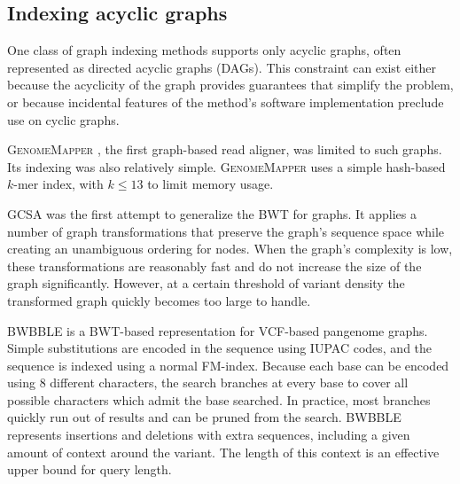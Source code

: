 \subsection{Indexing acyclic graphs}

One class of graph indexing methods supports only acyclic graphs, often represented as directed acyclic graphs (DAGs).
This constraint can exist either because the acyclicity of the graph provides guarantees that simplify the problem, or because incidental features of the method's software implementation preclude use on cyclic graphs.
 
\textsc{GenomeMapper} \cite{Schneeberger_2009}, the first graph-based read aligner, was limited to such graphs.
Its indexing was also relatively simple.
\textsc{GenomeMapper} uses a simple hash-based $k$-mer index, with $k \le 13$ to limit memory usage.

\textsc{GCSA} \cite{Siren_2014} was the first attempt to generalize the BWT for graphs.
It applies a number of graph transformations that preserve the graph's sequence space while creating an unambiguous ordering for nodes.
When the graph's complexity is low, these transformations are reasonably fast and do not increase the size of the graph significantly.
However, at a certain threshold of variant density the transformed graph quickly becomes too large to handle.

\textsc{BWBBLE} \cite{Huang_2013} is a BWT-based representation for VCF-based pangenome graphs.
Simple substitutions are encoded in the sequence using IUPAC codes, and the sequence is indexed using a normal FM-index.
Because each base can be encoded using 8 different characters, the search branches at every base to cover all possible characters which admit the base searched.
In practice, most branches quickly run out of results and can be pruned from the search.
\textsc{BWBBLE} represents insertions and deletions with extra sequences, including a given amount of context around the variant.
The length of this context is an effective upper bound for query length.

